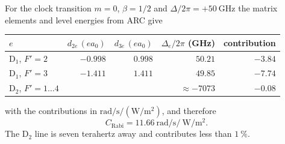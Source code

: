 For the clock transition $m=0$, $\beta=1/2$ and $\Delta/2\pi=+\SI{50}{\giga\hertz}$ the matrix elements
and level energies from ARC give
\begin{center}
\begin{tabular}{lrrrr}
\hline
$e$ & $d_{2e}\,(ea_0)$ & $d_{3e}\,(ea_0)$ & $\Delta_e/2\pi$ (GHz) & contribution \\ \hline
D$_1$, $F'=2$ & $-0.998$ & $0.998$ & $50.21$ & $-3.84$\\
D$_1$, $F'=3$ & $-1.411$ & $1.411$ & $49.85$ & $-7.74$\\
D$_2$, $F'=1\dots4$ & & & $\approx-7073$ & $-0.08$\\ \hline
\end{tabular}
\end{center}
with the contributions in $\si{\radian\per\second}/(\si{\watt\per\metre\squared})$, and therefore
\begin{equation}
C_\text{Rabi}=\SI{11.66}{\radian\per\second}\Big/\SI{}{\watt\per\metre\squared}.
\end{equation}
The D$_2$ line is seven terahertz away and contributes less than $\SI{1}{\percent}$.
